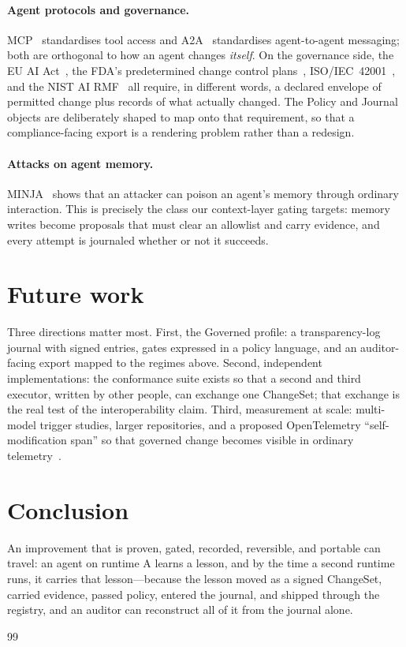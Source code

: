 \documentclass[10pt,twocolumn]{article}
\begin{document}
\paragraph{Agent protocols and governance.} MCP~\cite{mcp} standardises
tool access and A2A~\cite{a2a} standardises agent-to-agent messaging; both
are orthogonal to how an agent changes \emph{itself}. On the governance
side, the EU AI Act~\cite{euaiact}, the FDA's predetermined change control
plans~\cite{fdapccp}, ISO/IEC~42001~\cite{iso42001}, and the NIST AI
RMF~\cite{nistairmf} all require, in different words, a declared envelope
of permitted change plus records of what actually changed. The Policy and
Journal objects are deliberately shaped to map onto that requirement, so
that a compliance-facing export is a rendering problem rather than a
redesign.

\paragraph{Attacks on agent memory.} MINJA~\cite{minja} shows that an
attacker can poison an agent's memory through ordinary interaction. This is
precisely the class our context-layer gating targets: memory writes become
proposals that must clear an allowlist and carry evidence, and every
attempt is journaled whether or not it succeeds.

\section{Future work}
\label{sec:future}
Three directions matter most. First, the Governed profile: a
transparency-log journal with signed entries, gates expressed in a policy
language, and an auditor-facing export mapped to the regimes above. Second,
independent implementations: the conformance suite exists so that a second
and third executor, written by other people, can exchange one ChangeSet;
that exchange is the real test of the interoperability claim. Third,
measurement at scale: multi-model trigger studies, larger repositories, and
a proposed OpenTelemetry ``self-modification span'' so that governed change
becomes visible in ordinary telemetry~\cite{otelgenai}.

\section{Conclusion}
An improvement that is proven, gated, recorded, reversible, and portable
can travel: an agent on runtime A learns a lesson, and by the time a second
runtime runs, it carries that lesson---because the lesson moved as a signed
ChangeSet, carried evidence, passed policy, entered the journal, and shipped
through the registry, and an auditor can reconstruct all of it from the
journal alone.


\begin{thebibliography}{99}

\end{thebibliography}
\end{document}
